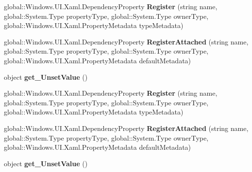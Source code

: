 \begin{DoxyCompactItemize}
global\+::\+Windows.\+U\+I.\+Xaml.\+Dependency\+Property {\bfseries Register} (string name, global\+::\+System.\+Type property\+Type, global\+::\+System.\+Type owner\+Type, global\+::\+Windows.\+U\+I.\+Xaml.\+Property\+Metadata type\+Metadata)
\item 
\mbox{\label{interface_windows_1_1_u_i_1_1_xaml_1_1_i_dependency_property_statics_ae43bcad9ef0a0efab0a70609013e7b53}} 
global\+::\+Windows.\+U\+I.\+Xaml.\+Dependency\+Property {\bfseries Register\+Attached} (string name, global\+::\+System.\+Type property\+Type, global\+::\+System.\+Type owner\+Type, global\+::\+Windows.\+U\+I.\+Xaml.\+Property\+Metadata default\+Metadata)
\item 
\mbox{\label{interface_windows_1_1_u_i_1_1_xaml_1_1_i_dependency_property_statics_aa28828abf71475e63362031e6a61c8fa}} 
object {\bfseries get\+\_\+\+Unset\+Value} ()
\item 
\mbox{\label{interface_windows_1_1_u_i_1_1_xaml_1_1_i_dependency_property_statics_a4e706c1d69fb6429a9f6fe61c7780e79}} 
global\+::\+Windows.\+U\+I.\+Xaml.\+Dependency\+Property {\bfseries Register} (string name, global\+::\+System.\+Type property\+Type, global\+::\+System.\+Type owner\+Type, global\+::\+Windows.\+U\+I.\+Xaml.\+Property\+Metadata type\+Metadata)
\item 
\mbox{\label{interface_windows_1_1_u_i_1_1_xaml_1_1_i_dependency_property_statics_ae43bcad9ef0a0efab0a70609013e7b53}} 
global\+::\+Windows.\+U\+I.\+Xaml.\+Dependency\+Property {\bfseries Register\+Attached} (string name, global\+::\+System.\+Type property\+Type, global\+::\+System.\+Type owner\+Type, global\+::\+Windows.\+U\+I.\+Xaml.\+Property\+Metadata default\+Metadata)
\item 
\mbox{\label{interface_windows_1_1_u_i_1_1_xaml_1_1_i_dependency_property_statics_aa28828abf71475e63362031e6a61c8fa}} 
object {\bfseries get\+\_\+\+Unset\+Value} ()
\item 
\mbox{\label{interface_windows_1_1_u_i_1_1_xaml_1_1_i_dependency_property_statics_a4e706c1d69fb6429a9f6fe61c7780e79}} 

\end{DoxyCompactItemize}
